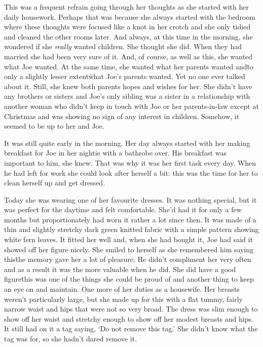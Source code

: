 This was a frequent refrain going through her thoughts as she 
started with her daily housework. Perhaps that was because she 
always started with the bedroom where these thoughts were focused 
like a knot in her crotch and she only tidied and cleaned the other 
rooms later. And always, at this time in the morning, she wondered 
if she \textit{really} wanted children. She thought she did. When 
they had married she had been very sure of it. And, of course, as well as this,
she wanted what Joe wanted. At the same time, she wanted what 
her parents wanted and\=to only a slightly lesser extent\=what 
Joe's parents wanted. Yet no one ever talked about it. Still, she knew 
both parents hopes and wishes for her. She didn't have any 
brothers or sisters and Joe's only sibling was a sister in a 
relationship with another woman who didn't keep in touch with Joe 
or her parents-in-law except at Christmas and was showing no sign 
of any interest in children. Somehow, it seemed to be up to her 
and Joe.

It was still quite early in the morning. Her day always started 
with her making breakfast for Joe in her nightie with a bathrobe 
over. His breakfast was important to him, she knew. That was why it 
was her first task every day. When he had left for work she could 
look after herself a bit: this was the time for her to clean 
herself up and get dressed.

Today she was wearing one of her favourite dresses. It was nothing 
special, but it was perfect for the daytime and felt 
comfortable. She'd had it for only a few months but proportionately 
had worn it rather a lot since then. It was made of a thin and 
slightly stretchy dark green knitted fabric with a simple pattern 
showing white fern leaves. It fitted her well and, when she had 
bought it, Joe had said it showed off her figure nicely. She 
smiled to herself as she remembered him saying this\=the memory 
gave her a lot of pleasure. He didn't compliment her very often and 
as a result it was the more valuable when he did. She did have a 
good figure\=this was one of the things she could be proud of and 
another thing to keep an eye on and maintain. One more of her duties as 
a housewife. Her breasts weren't particularly large, but she made 
up for this with a flat tummy, fairly narrow waist and hips that 
were not so very broad. The dress was slim enough to show off her 
waist and stretchy enough to show off her modest breasts and hips. 
It still had on it a tag saying, `Do not remove this tag.' She 
didn't know what the tag was for, so she hadn't dared remove it.

